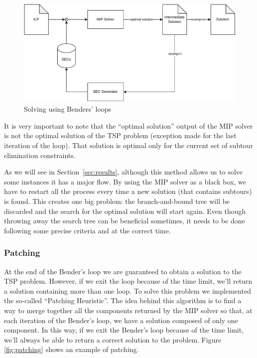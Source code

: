 \documentclass{article}
\begin{document}
\begin{figure}[ht]
        \caption{Solving using Benders' loops}
        \label{fig:benders}
        \centering
        \includegraphics[width=340pt]{assets/bendersloops.drawio.pdf}
\end{figure}

It is very important to note that the ``optimal solution'' output of the
MIP solver is not the optimal solution of the TSP problem (exception made
for the last iteration of the loop). That solution is optimal only for the
current set of subtour elimination constraints.

As we will see in Section~\ref{sec:results}, although this method allows us to
solve some instances it has a major flow. By using the MIP solver as a black
box, we have to restart all the process every time a new solution (that
contains subtours) is found. This creates one big problem: the branch-and-bound
tree will be discarded and the search for the optimal solution will start again.
Even though throwing away the search tree can be beneficial sometimes, %
it needs to be done following some precise criteria and at the correct time.

\subsubsection{Patching}
At the end of the Bender's loop we are guaranteed to obtain a solution to the TSP problem.
However, if we exit the loop because of the time limit, we'll return a solution containing more than
one loop. To solve this problem we implemented the so-called ``Patching Heuristic''.
The idea behind this algorithm is to find a way to merge together all the components returned by the MIP solver
so that, at each iteration of the Bender's loop, we have a solution composed of only one component.
In this way, if we exit the Bender's loop because of the time limit, we'll always be able to return a
correct solution to the problem.
Figure \ref{fig:patching} shows an example of patching.
\end{document}
